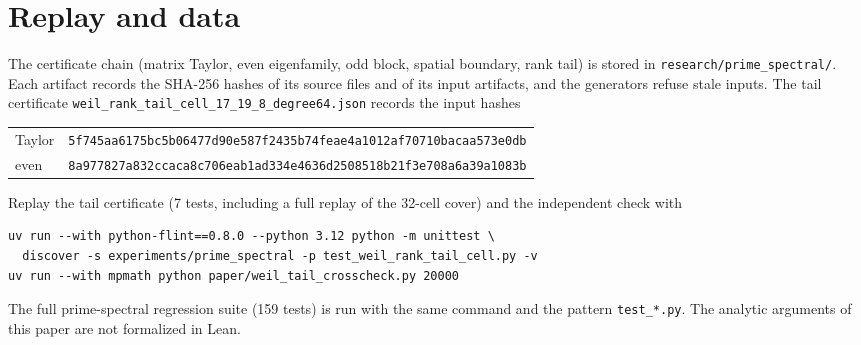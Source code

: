 \documentclass[11pt,a4paper]{article}
\theoremstyle{definition}
\begin{document}
\section{Replay and data}\label{app:repro}

The certificate chain (matrix Taylor, even eigenfamily, odd block, spatial
boundary, rank tail) is stored in \texttt{research/prime\_spectral/}. Each
artifact records the SHA-256 hashes of its source files and of its input
artifacts, and the generators refuse stale inputs. The tail certificate
\texttt{weil\_rank\_tail\_cell\_17\_19\_8\_degree64.json} records the input
hashes
\begin{center}\small
\begin{tabular}{@{}ll@{}}
Taylor & \texttt{5f745aa6175bc5b06477d90e587f2435b74feae4a1012af70710bacaa573e0db}\\
even & \texttt{8a977827a832ccaca8c706eab1ad334e4636d2508518b21f3e708a6a39a1083b}\\
\end{tabular}
\end{center}
Replay the tail certificate (7 tests, including a full replay of the 32-cell
cover) and the independent check with
\begin{verbatim}
uv run --with python-flint==0.8.0 --python 3.12 python -m unittest \
  discover -s experiments/prime_spectral -p test_weil_rank_tail_cell.py -v
uv run --with mpmath python paper/weil_tail_crosscheck.py 20000
\end{verbatim}
The full prime-spectral regression suite (159 tests) is run with the same
command and the pattern \texttt{test\_*.py}. The analytic arguments of this
paper are not formalized in Lean.
\end{document}
